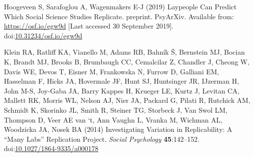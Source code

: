 \documentclass[
  english,
  a4paper,
]{article}
\newlength{\cslhangindent}
\newlength{\cslentryspacingunit} %
\newenvironment{CSLReferences}[2] %
 {%
  \setlength{\parindent}{0pt}
  \ifodd #1
  \let\oldpar\par
  \def\par{\hangindent=\cslhangindent\oldpar}
  \fi
  \setlength{\parskip}{#2\cslentryspacingunit}
 }%
 {}
\begin{document}
\begin{CSLReferences}{1}{0}
\leavevmode{}%
Hoogeveen S, Sarafoglou A, Wagenmakers E-J (2019) Laypeople {Can Predict Which Social Science Studies Replicate}. preprint. {PsyArXiv}. Available from: \url{https://osf.io/egw9d} {[}Last accessed 30 September 2019{]}. doi:\href{https://doi.org/10.31234/osf.io/egw9d}{10.31234/osf.io/egw9d}

\leavevmode{}%
Klein RA, Ratliff KA, Vianello M, Adams RB, Bahník Š, Bernstein MJ, Bocian K, Brandt MJ, Brooks B, Brumbaugh CC, Cemalcilar Z, Chandler J, Cheong W, Davis WE, Devos T, Eisner M, Frankowska N, Furrow D, Galliani EM, Hasselman F, Hicks JA, Hovermale JF, Hunt SJ, Huntsinger JR, IJzerman H, John M-S, Joy-Gaba JA, Barry Kappes H, Krueger LE, Kurtz J, Levitan CA, Mallett RK, Morris WL, Nelson AJ, Nier JA, Packard G, Pilati R, Rutchick AM, Schmidt K, Skorinko JL, Smith R, Steiner TG, Storbeck J, Van Swol LM, Thompson D, Veer AE van `t, Ann Vaughn L, Vranka M, Wichman AL, Woodzicka JA, Nosek BA (2014) Investigating {Variation} in {Replicability}: {A} {``{Many Labs}''} {Replication Project}. \emph{Social Psychology} \textbf{45}:142--152. doi:\href{https://doi.org/10.1027/1864-9335/a000178}{10.1027/1864-9335/a000178}


\end{CSLReferences}
\end{document}
